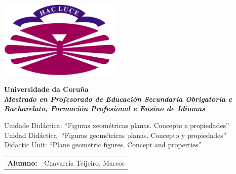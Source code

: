 %
%

%

\begin{titlepage}

	\begin{center}

		\includegraphics[width=6cm]{./eps/logo_udc.eps}
                \vspace{0.45cm}

		{\Large{\textbf{Universidade da Coruña}}}
		\\
		{\it \large{\textbf{Mestrado en Profesorado de Educación Secundaria Obrigatoria e Bacharelato, Formación Profesional e Ensino de Idiomas}}}
		\vspace{2.5cm}

                {\Huge Unidade Didáctica: ``Figuras xeométricas planas. Concepto e propiedades''} \\ \vspace{0.5cm}
                {\large Unidad Didáctica: ``Figuras geométricas planas. Concepto y propiedades''} \\ \vspace{0.15cm}
                {\large Didactic Unit: ``Plane geometric figures. Concept and properties''}


			\end{center}
                        \begin{bottompar}
                          \begin{flushright}
                            \begin{tabular}{rl}
                              \large{\textbf{Alumno:}}	&
			      \large{Chavarría Teijeiro, Marcos} \\


\end{tabular}
\end{flushright}
\end{bottompar}
\end{titlepage}
